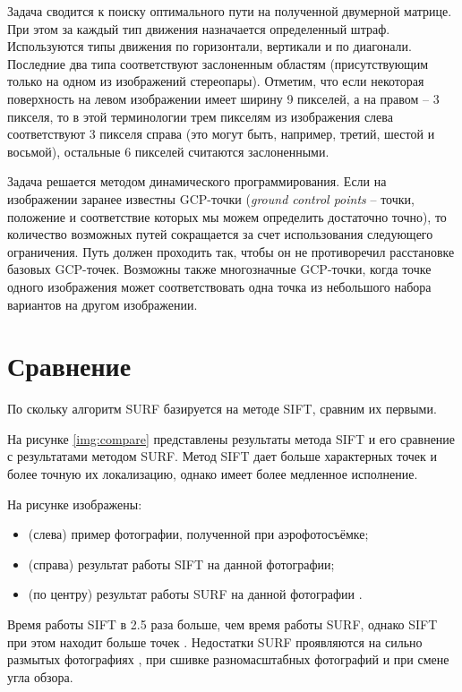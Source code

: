 Задача сводится к поиску оптимального пути на
полученной двумерной матрице. При этом за каждый
тип движения назначается определенный штраф. Используются типы движения по горизонтали, вертикали и по диагонали. Последние два типа соответствуют
заслоненным областям (присутствующим только на
одном из изображений стереопары). Отметим, что
если некоторая поверхность на левом изображении
имеет ширину 9 пикселей, а на правом -- 3 пикселя, то
в этой терминологии трем пикселям из изображения
слева соответствуют 3 пикселя справа (это могут
быть, например, третий, шестой и восьмой), остальные 6 пикселей считаются заслоненными.

Задача решается методом динамического программирования. Если на изображении заранее известны GCP-точки (\textit{ground control points} -- точки, положение и соответствие которых мы можем определить
достаточно точно), то количество возможных путей
сокращается за счет использования следующего ограничения. Путь должен проходить так, чтобы он не
противоречил расстановке базовых GCP-точек. Возможны также многозначные GCP-точки, когда точке
одного изображения может соответствовать одна точка из небольшого набора вариантов на другом изображении.

\chapter{Сравнение}

По скольку алгоритм SURF базируется на методе SIFT, сравним их первыми.

На рисунке \ref{img:compare} представлены результаты метода SIFT и его сравнение с результатами методом SURF. Метод SIFT дает больше характерных точек и более точную их локализацию, однако имеет более медленное исполнение.


На рисунке изображены:

\begin{itemize}
	\item (слева) пример фотографии, полученной при аэрофотосъёмке;
	\item (справа) результат работы SIFT на данной фотографии;
	\item (по центру) результат работы SURF на данной фотографии \cite{comp1}.
\end{itemize}

Время работы SIFT в 2.5 раза больше, чем время работы SURF, однако SIFT при этом находит больше точек \cite{comp1}. Недостатки SURF проявляются на сильно размытых фотографиях \cite{comp2, comp3}, при сшивке разномасштабных фотографий и при смене угла обзора.

